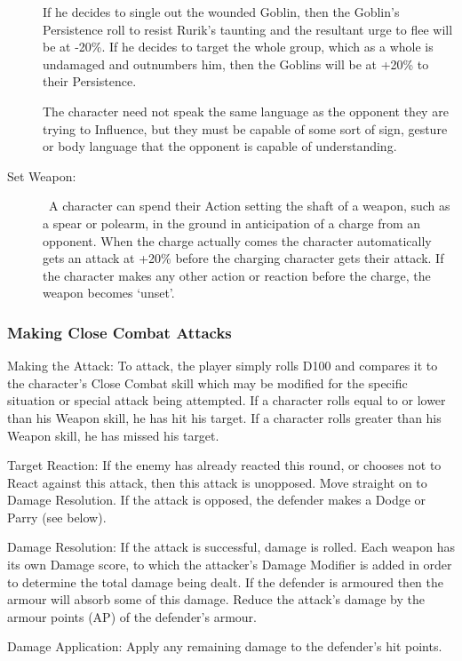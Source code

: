 \begin{description}
\begin{rpg-examplebox}
If he decides to single out the wounded Goblin, then the Goblin’s Persistence roll to resist Rurik’s taunting and the resultant urge to flee will be at -20\%. If he decides to target the whole group, which as a whole is undamaged and outnumbers him, then the Goblins will be at +20\% to their Persistence. 
	\end{rpg-examplebox}

The character need not speak the same language as the opponent they are trying to Influence, but they must be capable of some sort of sign, gesture or body language that the opponent is capable of understanding.

	\item[Set Weapon:]  A character can spend their Action setting the shaft of a weapon, such as a spear or polearm, in the ground in anticipation of a charge from an opponent. When the charge actually comes the character automatically gets an attack at +20\% before the charging character gets their attack. If the character makes any other action or reaction before the charge, the weapon becomes ‘unset’.
\end{description}


\subsubsection{Making Close Combat Attacks}
\begin{rpg-list}
\item Making the Attack: To attack, the player simply rolls D100 and compares it to the character’s Close Combat skill which may be modified for the specific situation or special attack being attempted. If a character rolls equal to or lower than his Weapon skill, he has hit his target. If a character rolls greater than his Weapon skill, he has missed his target. 

\item Target Reaction: If the enemy has already reacted this round, or chooses not to React against this attack, then this attack is unopposed. Move straight on to Damage Resolution. If the attack is opposed, the defender makes a Dodge or Parry (see below).

\item Damage Resolution: If the attack is successful, damage is rolled. Each weapon has its own Damage score, to which the attacker’s Damage Modifier is added in order to determine the total damage being dealt. If the defender is armoured then the armour will absorb some of this damage. Reduce the attack’s damage by the armour points (AP) of the defender’s armour. 

\item Damage Application: Apply any remaining damage to the defender’s hit points. 
\end{rpg-list}

